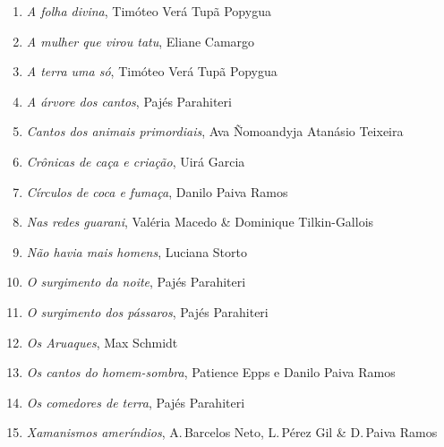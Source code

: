\medskip
{}

\begin{enumerate}
\setlength\parskip{4.2pt}
\setlength\itemsep{-1.4mm}
\item \textit{A folha divina}, Timóteo Verá Tupã Popygua
\item \textit{A mulher que virou tatu}, Eliane Camargo
\item \textit{A terra uma só}, Timóteo Verá Tupã Popygua
\item \textit{A árvore dos cantos}, Pajés Parahiteri
\item \textit{Cantos dos animais primordiais}, Ava Ñomoandyja Atanásio Teixeira
\item \textit{Crônicas de caça e criação}, Uirá Garcia
\item \textit{Círculos de coca e fumaça}, Danilo Paiva Ramos
\item \textit{Nas redes guarani}, Valéria Macedo \& Dominique Tilkin-Gallois
\item \textit{Não havia mais homens}, Luciana Storto
\item \textit{O surgimento da noite}, Pajés Parahiteri
\item \textit{O surgimento dos pássaros}, Pajés Parahiteri
\item \textit{Os Aruaques}, Max Schmidt
\item \textit{Os cantos do homem-sombra}, Patience Epps e Danilo Paiva Ramos
\item \textit{Os comedores de terra}, Pajés Parahiteri
\item \textit{Xamanismos ameríndios}, A.\,Barcelos Neto, L.\,Pérez Gil \& D.\,Paiva Ramos
\end{enumerate}

\medskip
{}


